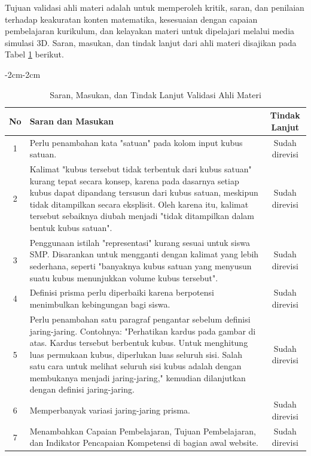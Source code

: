 \begin{enumerate}[leftmargin=1cm, label=\arabic*.]
\begin{enumerate}[label=\arabic*)]
        \hspace*{1cm}Tujuan validasi ahli materi adalah untuk memperoleh kritik, saran, dan penilaian terhadap keakuratan konten matematika, kesesuaian dengan capaian pembelajaran kurikulum, dan kelayakan materi untuk dipelajari melalui media simulasi 3D. Saran, masukan, dan tindak lanjut dari ahli materi disajikan pada Tabel \ref{tabel:validasimateri} berikut.
        \begin{table}[H]
\begin{adjustwidth}{-2cm}{-2cm}
    \centering
    \caption{Saran, Masukan, dan Tindak Lanjut Validasi Ahli Materi}
    \label{tabel:validasimateri}
    \begin{tabular}{|c|p{9cm}|c|}
        \hline
        \textbf{No} & \textbf{Saran dan Masukan} & \textbf{Tindak Lanjut} \\
        \hline
        1 & Perlu penambahan kata "satuan" pada kolom input kubus satuan. & Sudah direvisi \\
        \hline
        2 & Kalimat "kubus tersebut tidak terbentuk dari kubus satuan" kurang tepat secara konsep, karena pada dasarnya setiap kubus dapat dipandang tersusun dari kubus satuan, meskipun tidak ditampilkan secara eksplisit. Oleh karena itu, kalimat tersebut sebaiknya diubah menjadi "tidak ditampilkan dalam bentuk kubus satuan". & Sudah direvisi \\
        \hline
        3 & Penggunaan istilah "representasi" kurang sesuai untuk siswa SMP. Disarankan untuk mengganti dengan kalimat yang lebih sederhana, seperti "banyaknya kubus satuan yang menyusun suatu kubus menunjukkan volume kubus tersebut". & Sudah direvisi \\
        \hline
        4 & Definisi prisma perlu diperbaiki karena berpotensi menimbulkan kebingungan bagi siswa. & Sudah direvisi \\
        \hline
        5 & Perlu penambahan satu paragraf pengantar sebelum definisi jaring-jaring. Contohnya: "Perhatikan kardus pada gambar di atas. Kardus tersebut berbentuk kubus. Untuk menghitung luas permukaan kubus, diperlukan luas seluruh sisi. Salah satu cara untuk melihat seluruh sisi kubus adalah dengan membukanya menjadi jaring-jaring," kemudian dilanjutkan dengan definisi jaring-jaring. & Sudah direvisi \\
        \hline
        6 & Memperbanyak variasi jaring-jaring prisma. & Sudah direvisi \\
        \hline
        7 & Menambahkan Capaian Pembelajaran, Tujuan Pembelajaran, dan Indikator Pencapaian Kompetensi di bagian awal website. & Sudah direvisi \\
        \hline
    \end{tabular}
\end{adjustwidth}
\end{table}
\newpage
        

\end{enumerate}
\end{enumerate}

